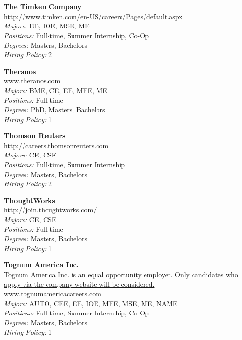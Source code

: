 \documentclass[twoside]{article}
\begin{document}
\begin{center}
\begin{multicols}{3}
\begin{minipage}{.9\columnwidth}{\Large\bf The Timken Company }\\
	\url{http://www.timken.com/en-US/careers/Pages/default.aspx}\\
	\emph{Majors:} EE, IOE, MSE, ME\\
	\emph{Positions:} Full-time, Summer Internship, Co-Op\\
	\emph{Degrees:} Masters, Bachelors\\
	\emph{Hiring Policy:} 2\\
\end{minipage}
 
\begin{minipage}{.9\columnwidth}{\Large\bf Theranos }\\
	\url{www.theranos.com}\\
	\emph{Majors:} BME, CE, EE, MFE, ME\\
	\emph{Positions:} Full-time\\
	\emph{Degrees:} PhD, Masters, Bachelors\\
	\emph{Hiring Policy:} 1\\
\end{minipage}
 
\begin{minipage}{.9\columnwidth}{\Large\bf Thomson Reuters }\\
	\url{http://careers.thomsonreuters.com}\\
	\emph{Majors:} CE, CSE\\
	\emph{Positions:} Full-time, Summer Internship\\
	\emph{Degrees:} Masters, Bachelors\\
	\emph{Hiring Policy:} 2\\
\end{minipage}
 
\begin{minipage}{.9\columnwidth}{\Large\bf ThoughtWorks }\\
	\url{http://join.thoughtworks.com/}\\
	\emph{Majors:} CE, CSE\\
	\emph{Positions:} Full-time\\
	\emph{Degrees:} Masters, Bachelors\\
	\emph{Hiring Policy:} 1\\
\end{minipage}
 
\begin{minipage}{.9\columnwidth}{\Large\bf Tognum America Inc. }\\
	\url{Tognum America Inc. is an equal opportunity employer. Only candidates who apply via the company website will be considered. www.tognumamericacareers.com}\\
	\emph{Majors:} AUTO, CEE, EE, IOE, MFE, MSE, ME, NAME\\
	\emph{Positions:} Full-time, Summer Internship, Co-Op\\
	\emph{Degrees:} Masters, Bachelors\\
	\emph{Hiring Policy:} 1\\
\end{minipage}
 

\end{multicols}
\end{center}
\end{document}

